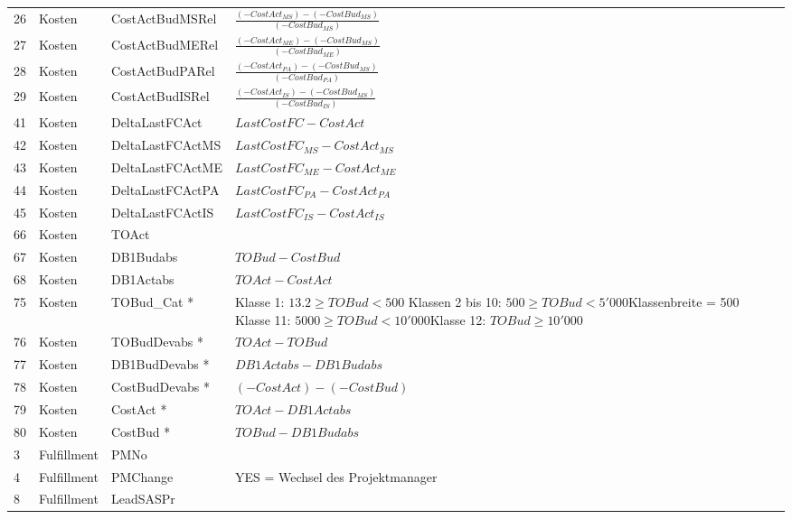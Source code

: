 \begin{longtable}{p{0.5cm}|p{4cm}|p{3.5cm}|p{6cm}}
	26    & Kosten & CostActBudMSRel & $\frac{(-CostAct_{MS}) - (-CostBud_{MS})}{(-CostBud_{MS})}$ \\ [3mm]
	27    & Kosten & CostActBudMERel & $\frac{(-CostAct_{ME}) - (-CostBud_{MS})}{(-CostBud_{ME})}$ \\ [3mm]
	28    & Kosten & CostActBudPARel & $\frac{(-CostAct_{PA}) - (-CostBud_{MS})}{(-CostBud_{PA})}$ \\ [3mm]
	29    & Kosten & CostActBudISRel & $\frac{(-CostAct_{IS}) - (-CostBud_{MS})}{(-CostBud_{IS})}$ \\ [3mm]
	41    & Kosten & DeltaLastFCAct & $Last Cost FC-Cost Act$ \\
	42    & Kosten & DeltaLastFCActMS & $Last Cost FC_{MS}-Cost Act_{MS}$ \\
	43    & Kosten & DeltaLastFCActME & $Last Cost FC_{ME}-Cost Act_{ME}$ \\
	44    & Kosten & DeltaLastFCActPA & $Last Cost FC_{PA}-Cost Act_{PA}$\\
	45    & Kosten & DeltaLastFCActIS & $Last Cost FC_{IS}-Cost Act_{IS}$\\
	66    & Kosten & TOAct &\\
	67    & Kosten & DB1Budabs & $TOBud-CostBud$\\
	68    & Kosten & DB1Actabs & $TOAct-CostAct$\\
	75    & Kosten & TOBud\_Cat * &
\small Klasse 1: $13.2 \geq TOBud < 500$ \newline Klassen 2 bis 10: \newline $500 \geq TOBud < 5'000$\newline Klassenbreite = 500 \newline Klasse 11: $5000 \geq TOBud < 10'000$\newline Klasse 12: $ TOBud \geq 10'000$\\
	76    & Kosten & TOBudDevabs * & $TOAct-TOBud$\\
	77    & Kosten & DB1BudDevabs * & $DB1Actabs-DB1Budabs$\\
	78    & Kosten & CostBudDevabs * & $(-CostAct)-(-CostBud)$ \\
	79    & Kosten & CostAct *& $TOAct-DB1Actabs$\\
	80    & Kosten & CostBud * & $TOBud-DB1Budabs$\\\hline
	3     & Fulfillment & PMNo & \\
	4     & Fulfillment & PMChange & YES = Wechsel des Projektmanager \\
	8     & Fulfillment & LeadSASPr & \\

\end{longtable}
